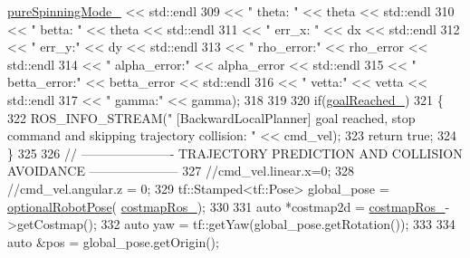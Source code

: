 \begin{DoxyCode}
{      \hyperlink{classcl__move__base__z_1_1backward__local__planner_1_1BackwardLocalPlanner_aebc89ccfa79fdf6bd45ba35134bec3fb}{pureSpinningMode\_} << std::endl
309                                               << \textcolor{stringliteral}{" theta: "} << theta << std::endl
310                                               << \textcolor{stringliteral}{" betta: "} << theta << std::endl
311                                               << \textcolor{stringliteral}{" err\_x: "} << dx << std::endl
312                                               << \textcolor{stringliteral}{" err\_y:"} << dy << std::endl
313                                               << \textcolor{stringliteral}{" rho\_error:"} << rho\_error << std::endl
314                                               << \textcolor{stringliteral}{" alpha\_error:"} << alpha\_error << std::endl
315                                               << \textcolor{stringliteral}{" betta\_error:"} << betta\_error << std::endl
316                                               << \textcolor{stringliteral}{" vetta:"} << vetta << std::endl
317                                               << \textcolor{stringliteral}{" gamma:"} << gamma);
318 
319 
320             \textcolor{keywordflow}{if}(\hyperlink{classcl__move__base__z_1_1backward__local__planner_1_1BackwardLocalPlanner_ad443c52ef585a8eab0364f0909222f51}{goalReached\_})
321             \{
322                 ROS\_INFO\_STREAM(\textcolor{stringliteral}{" [BackwardLocalPlanner] goal reached, stop command and skipping trajectory
       collision: "} << cmd\_vel);
323                 \textcolor{keywordflow}{return} \textcolor{keyword}{true};
324             \}
325 
326             \textcolor{comment}{// ---------------------- TRAJECTORY PREDICTION AND COLLISION AVOIDANCE ---------------------}
327             \textcolor{comment}{//cmd\_vel.linear.x=0;}
328             \textcolor{comment}{//cmd\_vel.angular.z = 0;}
329             tf::Stamped<tf::Pose> global\_pose = \hyperlink{namespacecl__move__base__z_1_1backward__local__planner_afd5bb2a0d144f7b89f4215fbcb1fbe69}{optionalRobotPose}(
      \hyperlink{classcl__move__base__z_1_1backward__local__planner_1_1BackwardLocalPlanner_a4136268882a105d9e06e173d85d5c0dc}{costmapRos\_});
330 
331             \textcolor{keyword}{auto} *costmap2d = \hyperlink{classcl__move__base__z_1_1backward__local__planner_1_1BackwardLocalPlanner_a4136268882a105d9e06e173d85d5c0dc}{costmapRos\_}->getCostmap();
332             \textcolor{keyword}{auto} yaw = tf::getYaw(global\_pose.getRotation());
333 
334             \textcolor{keyword}{auto} &pos = global\_pose.getOrigin();
}
\end{DoxyCode}
